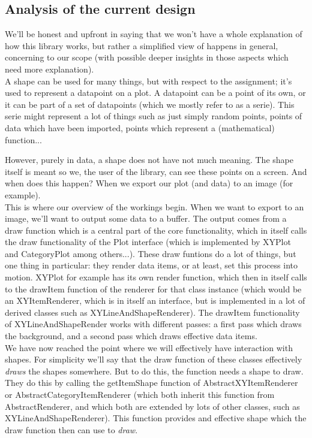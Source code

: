 \documentclass{article}
\begin{document}
\subsection{Analysis of the current design}

We'll be honest and upfront in saying that we won't have a whole explanation of how this library works, but rather a simplified view of happens in general, concerning to our scope (with possible deeper insights in those aspects which need more explanation).\\

A shape can be used for many things, but with respect to the assignment; it's used to represent a datapoint on a plot. A datapoint can be a point of its own, or it can be part of a set of datapoints (which we mostly refer to as a serie). This serie might represent a lot of things such as just simply random points, points of data which have been imported, points which represent a (mathematical) function... 

However, purely in data, a shape does not have not much meaning. The shape itself is meant so we, the user of the library, can see these points on a screen. And when does this happen? When we export our plot (and data) to an image (for example).\\

This is where our overview of the workings begin. When we want to export to an image, we'll want to output some data to a buffer. The output comes from a draw function which is a central part of the core functionality, which in itself calls the draw functionality of the Plot interface (which is implemented by XYPlot and CategoryPlot among others...). These draw funtions do a lot of things, but one thing in particular: they render data items, or at least, set this process into motion. XYPlot for example has its own render function, which then in itself calls to the drawItem function of the renderer for that class instance (which would be an XYItemRenderer, which is in itself an interface, but is implemented in a lot of derived classes such as XYLineAndShapeRenderer). The drawItem functionality of XYLineAndShapeRender works with different passes: a first pass which draws the background, and a second pass which draws effective data items.\\

We have now reached the point where we will effectively have interaction with shapes. For simplicity we'll say that the draw function of these classes effectively \textit{draws} the shapes somewhere. But to do this, the function needs a shape to draw. They do this by calling the getItemShape function of AbstractXYItemRenderer or AbstractCategoryItemRenderer (which both inherit this function from AbstractRenderer, and which both are extended by lots of other classes, such as XYLineAndShapeRenderer). This function provides and effective shape which the draw function then can use to \textit{draw}.
\end{document}
